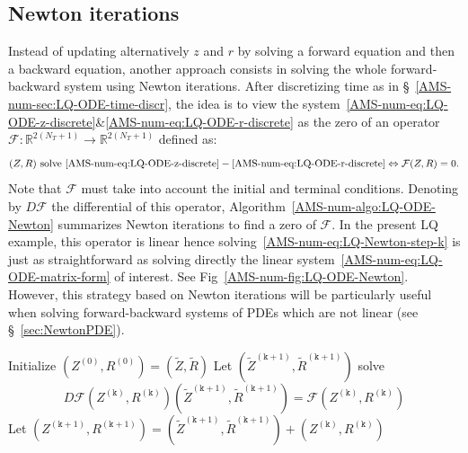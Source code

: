 \documentclass{amsproc}
\theoremstyle{definition}
\theoremstyle{remark}
\numberwithin{equation}{section}
\newcommand{\RR}{{\mathbb R}}
\begin{document}
\subsection{Newton iterations}

Instead of updating alternatively $z$ and $r$ by solving a forward equation and then a backward equation, another approach consists in solving the whole forward-backward system using Newton iterations. After discretizing time as in \S~\ref{AMS-num-sec:LQ-ODE-time-discr}, the idea is to view the system~\eqref{AMS-num-eq:LQ-ODE-z-discrete}\&\eqref{AMS-num-eq:LQ-ODE-r-discrete} as the zero of an operator $\mathcal{F}: \RR^{2(N_T+1)} \to \RR^{2(N_T+1)}$ defined as:
$$
	(Z,R) \hbox{ solve } \eqref{AMS-num-eq:LQ-ODE-z-discrete}-\eqref{AMS-num-eq:LQ-ODE-r-discrete} \Leftrightarrow \mathcal{F}(Z,R) = 0.
$$
Note that $\mathcal{F}$ must take into account the initial and terminal conditions. 
Denoting by $D \mathcal{F}$ the differential of this operator, Algorithm~\ref{AMS-num-algo:LQ-ODE-Newton} summarizes Newton iterations to find a zero of $\mathcal{F}$.  In the present LQ example, this operator is linear hence solving~\eqref{AMS-num-eq:LQ-Newton-step-k} is just as straightforward as solving directly the linear system~\eqref{AMS-num-eq:LQ-ODE-matrix-form} of interest. See Fig~\ref{AMS-num-fig:LQ-ODE-Newton}. However, this strategy based on Newton iterations will be particularly useful when solving forward-backward systems of PDEs which are not linear (see \S~\ref{sec:NewtonPDE}). 




\begin{algorithm}[H]
\DontPrintSemicolon
  
  Initialize $(Z^{(0)}, R^{(0)}) = (\tilde Z, \tilde R)$ \;
        { 
        	Let $(\tilde Z^{(\mathtt{k}+1)},\tilde R^{(\mathtt{k}+1)})$ solve 
	\begin{equation}
	\label{AMS-num-eq:LQ-Newton-step-k}
		 D\mathcal{F}(Z^{(\mathtt{k})}, R^{(\mathtt{k})})(\tilde Z^{(\mathtt{k}+1)},\tilde R^{(\mathtt{k}+1)}) = \mathcal{F}(Z^{(\mathtt{k})}, R^{(\mathtt{k})})  
	\end{equation}\;
	Let $(Z^{(\mathtt{k}+1)}, R^{(\mathtt{k}+1)}) = (\tilde Z^{(\mathtt{k}+1)},\tilde R^{(\mathtt{k}+1)}) + (Z^{(\mathtt{k})}, R^{(\mathtt{k})})$ \;
	\;
        }

\caption{Newton Iterations \label{AMS-num-algo:LQ-ODE-Newton}}
\end{algorithm}
\end{document}
